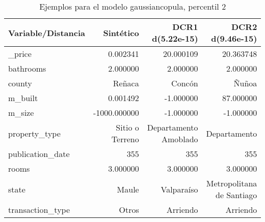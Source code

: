 \begin{table}[H]
\centering
\fontsize{10}{14}\selectfont
\caption{Ejemplos para el modelo gaussiancopula, percentil 2}
\label{table-example-economicos-b-3-gaussiancopula-2p}
\begin{tabular}{|l|r|r|r|}
\hline
\rowcolor[gray]{0.8}
Variable/Distancia & Sintético & DCR1 d(5.22e-15) & DCR2 d(9.46e-15) \\
\hline \_price & \cellcolor[rgb]{0.9, 0.54, 0.52} 0.002341 & 20.000109 & 20.363748 \\
\hline bathrooms & \cellcolor[rgb]{0.9, 0.54, 0.52} 2.000000 & \cellcolor[rgb]{0.9, 0.54, 0.52} 2.000000 & \cellcolor[rgb]{0.9, 0.54, 0.52} 2.000000 \\
\hline county & \cellcolor[rgb]{0.9, 0.54, 0.52} Reñaca & Concón & Ñuñoa \\
\hline m\_built & \cellcolor[rgb]{0.9, 0.54, 0.52} 0.001492 & \cellcolor[rgb]{0.9, 0.54, 0.52} -1.000000 & 87.000000 \\
\hline m\_size & \cellcolor[rgb]{0.9, 0.54, 0.52} -1000.000000 & \cellcolor[rgb]{0.9, 0.54, 0.52} -1.000000 & \cellcolor[rgb]{0.9, 0.54, 0.52} -1.000000 \\
\hline property\_type & \cellcolor[rgb]{0.9, 0.54, 0.52} Sitio o Terreno & Departamento Amoblado & Departamento \\
\hline publication\_date & \cellcolor[rgb]{0.9, 0.54, 0.52} 355 & \cellcolor[rgb]{0.9, 0.54, 0.52} 355 & \cellcolor[rgb]{0.9, 0.54, 0.52} 355 \\
\hline rooms & \cellcolor[rgb]{0.9, 0.54, 0.52} 3.000000 & \cellcolor[rgb]{0.9, 0.54, 0.52} 3.000000 & \cellcolor[rgb]{0.9, 0.54, 0.52} 3.000000 \\
\hline state & \cellcolor[rgb]{0.9, 0.54, 0.52} Maule & Valparaíso & Metropolitana de Santiago \\
\hline transaction\_type & \cellcolor[rgb]{0.9, 0.54, 0.52} Otros & Arriendo & Arriendo \\
\hline
\end{tabular}
\end{table}
